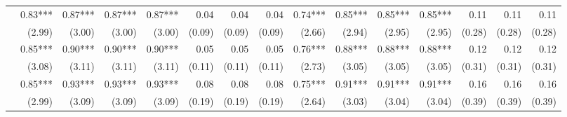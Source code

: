 \begin{tabularx}{1.45\textwidth}{lRRRRRRRRRRRRRR}
		 & \num{0.83}***\phantom{)} & \num{0.87}***\phantom{)} & \num{0.87}***\phantom{)} & \num{0.87}***\phantom{)} & \num{0.04}\phantom{***)} & \num{0.04}\phantom{***)} & \num{0.04}\phantom{***)} & \num{0.74}***\phantom{)} & \num{0.85}***\phantom{)} & \num{0.85}***\phantom{)} & \num{0.85}***\phantom{)} & \num{0.11}\phantom{***)} & \num{0.11}\phantom{***)} & \num{0.11}\phantom{***)} \\
		 & (\num{2.99})\phantom{***} & (\num{3.00})\phantom{***} & (\num{3.00})\phantom{***} & (\num{3.00})\phantom{***} & (\num{0.09})\phantom{***} & (\num{0.09})\phantom{***} & (\num{0.09})\phantom{***} & (\num{2.66})\phantom{***} & (\num{2.94})\phantom{***} & (\num{2.95})\phantom{***} & (\num{2.95})\phantom{***} & (\num{0.28})\phantom{***} & (\num{0.28})\phantom{***} & (\num{0.28})\phantom{***} \\ [\dspacing]
		 & \num{0.85}***\phantom{)} & \num{0.90}***\phantom{)} & \num{0.90}***\phantom{)} & \num{0.90}***\phantom{)} & \num{0.05}\phantom{***)} & \num{0.05}\phantom{***)} & \num{0.05}\phantom{***)} & \num{0.76}***\phantom{)} & \num{0.88}***\phantom{)} & \num{0.88}***\phantom{)} & \num{0.88}***\phantom{)} & \num{0.12}\phantom{***)} & \num{0.12}\phantom{***)} & \num{0.12}\phantom{***)} \\
		 & (\num{3.08})\phantom{***} & (\num{3.11})\phantom{***} & (\num{3.11})\phantom{***} & (\num{3.11})\phantom{***} & (\num{0.11})\phantom{***} & (\num{0.11})\phantom{***} & (\num{0.11})\phantom{***} & (\num{2.73})\phantom{***} & (\num{3.05})\phantom{***} & (\num{3.05})\phantom{***} & (\num{3.05})\phantom{***} & (\num{0.31})\phantom{***} & (\num{0.31})\phantom{***} & (\num{0.31})\phantom{***} \\ [\dspacing]
		 & \num{0.85}***\phantom{)} & \num{0.93}***\phantom{)} & \num{0.93}***\phantom{)} & \num{0.93}***\phantom{)} & \num{0.08}\phantom{***)} & \num{0.08}\phantom{***)} & \num{0.08}\phantom{***)} & \num{0.75}***\phantom{)} & \num{0.91}***\phantom{)} & \num{0.91}***\phantom{)} & \num{0.91}***\phantom{)} & \num{0.16}\phantom{***)} & \num{0.16}\phantom{***)} & \num{0.16}\phantom{***)} \\
		 & (\num{2.99})\phantom{***} & (\num{3.09})\phantom{***} & (\num{3.09})\phantom{***} & (\num{3.09})\phantom{***} & (\num{0.19})\phantom{***} & (\num{0.19})\phantom{***} & (\num{0.19})\phantom{***} & (\num{2.64})\phantom{***} & (\num{3.03})\phantom{***} & (\num{3.04})\phantom{***} & (\num{3.04})\phantom{***} & (\num{0.39})\phantom{***} & (\num{0.39})\phantom{***} & (\num{0.39})\phantom{***} \\ [\dspacing]

\end{tabularx}
